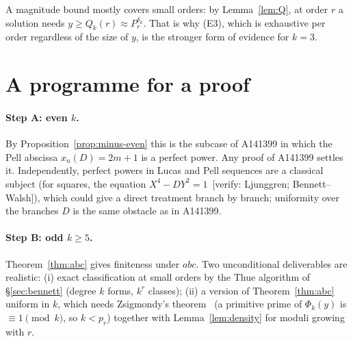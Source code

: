 \documentclass[11pt]{article}
\theoremstyle{definition}
\theoremstyle{remark}
\newcommand{\verify}[1]{{\color{red!70!black}\,[verify: #1]}}
\begin{document}
A magnitude bound mostly covers small orders: by Lemma~\ref{lem:Q}, at order $r$
a solution needs $y\ge Q_k(r)\approx P_r^{\delta_k}$. That is why (E3), which is
exhaustive per order regardless of the size of $y$, is the stronger form of
evidence for $k=3$.

\section{A programme for a proof}\label{sec:path}

\paragraph{Step A: even $k$.} By Proposition~\ref{prop:minus-even} this is the
subcase of A141399 in which the Pell abscissa $x_n(D)=2m+1$ is a perfect power.
Any proof of A141399 settles it. Independently, perfect powers in Lucas and Pell
sequences are a classical subject (for squares, the equation $X^4-DY^2=1$
\verify{Ljunggren; Bennett--Walsh}), which could give a direct treatment branch
by branch; uniformity over the branches $D$ is the same obstacle as in A141399.

\paragraph{Step B: odd $k\ge5$.} Theorem~\ref{thm:abc} gives finiteness under
$abc$. Two unconditional deliverables are realistic: (i) exact classification at
small orders by the Thue algorithm of \S\ref{sec:bennett} (degree $k$ forms,
$k^r$ classes); (ii) a version of Theorem~\ref{thm:abc} uniform in $k$, which
needs Zsigmondy's theorem~\cite{Zsigmondy} (a primitive prime of $\Phi_k(y)$ is
$\equiv1\pmod k$, so $k<p_r$) together with Lemma~\ref{lem:density} for moduli
growing with $r$.
\end{document}
